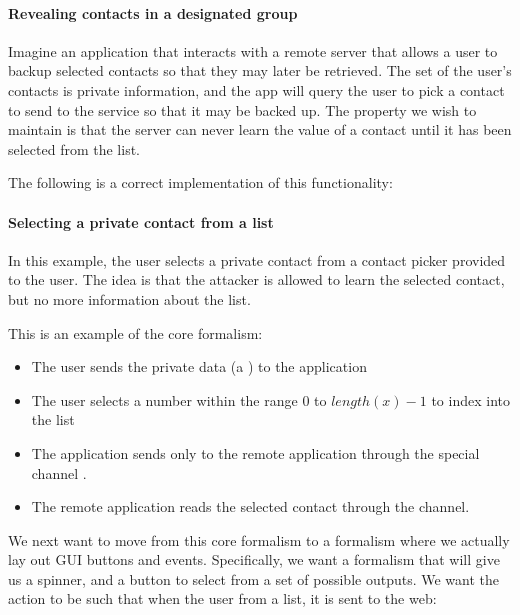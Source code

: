 \paragraph{Revealing contacts in a designated group}

Imagine an application that interacts with a remote server that allows
a user to backup selected contacts so that they may later be
retrieved.  The set of the user's contacts is private information, and
the app will query the user to pick a contact to send to the service
so that it may be backed up.  The property we wish to maintain is that
the server can never learn the value of a contact until it has been
selected from the list.

The following is a correct implementation of this functionality:





\paragraph{Selecting a private contact from a list}

In this example, the user selects a private contact from a contact
picker provided to the user.  The idea is that the attacker is allowed
to learn the selected contact, but no more information about the list.

This is an example of the core formalism:
\begin{itemize}

\item The user sends the private data (a ) to the
  application
\item The user selects a number within the range $0$ to $length(x) -
  1$ to index into the list
\item The application sends only  to the remote application
  through the special channel .
\item The remote application reads the selected contact through the
   channel.
\end{itemize}



We next want to move from this core formalism to a formalism where we
actually lay out GUI buttons and events.  Specifically, we want a
formalism that will give us a spinner, and a button to select from a
set of possible outputs.  We want the action to be such that when the
user from a list, it is sent to the web:

